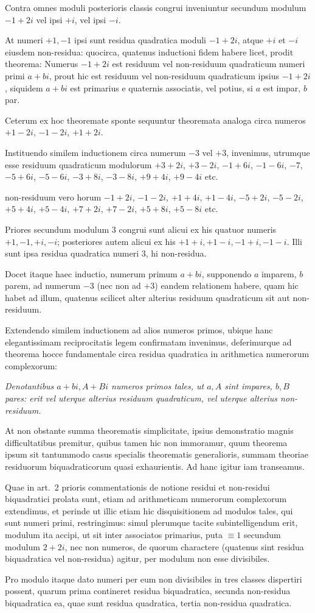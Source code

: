 Contra omnes moduli posterioris classis congrui inveniuntur secundum modulum $-1+2i$ vel ipsi $+i$, vel ipsi $-i$.

At numeri $+1,-1$ ipsi sunt residua quadratica moduli $-1+2i$, atque $+i$ et $-i$ eiusdem non-residua: quocirca, quatenus inductioni fidem habere licet, prodit theorema: Numerus $-1+2i$ est residuum vel non-residuum quadraticum numeri primi $a+bi$, prout hic est residuum vel non-residuum quadraticum ipsius $-1+2i$, siquidem $a+bi$ est primarius e quaternis associatis, vel potius, si $a$ est impar, $b$ par.

Ceterum ex hoc theoremate sponte sequuntur theoremata analoga circa numeros $+1-2i$, $-1-2i$, $+1+2i$.

Instituendo similem inductionem circa numerum $-3$ vel $+3$, invenimus, utrumque esse residuum quadraticum modulorum $+3+2i$, $+3-2i$,
%
$-1+6i$, $-1-6i$, $-7$, $-5+6i$, $-5-6i$, $-3+8i$, $-3-8i$, $+9+4i$, $+9-4i$ etc.

non-residuum vero horum $-1+2i$, $-1-2i$, $+1+4i$, $+1-4i$, $-5+2i$, $-5-2i$, $+5+4i$, $+5-4i$, $+7+2i$, $+7-2i$, $+5+8i$, $+5-8i$ etc.

Priores secundum modulum $3$ congrui sunt alicui ex his quatuor numeris $+1,-1,+i,-i$; posteriores autem alicui ex his $+1+i,+1-i,-1+i,-1-i$. Illi sunt ipsa residua quadratica numeri $3$, hi non-residua.

Docet itaque haec inductio, numerum primum $a+bi$, supponendo $a$ imparem, $b$ parem, ad numerum $-3$ (nec non ad $+3$) eandem relationem habere, quam hic habet ad illum, quatenus scilicet alter alterius residuum quadraticum sit aut non-residuum.

Extendendo similem inductionem ad alios numeros primos, ubique hanc elegantissimam reciprocitatis legem confirmatam invenimus, deferimurque ad theorema hocce fundamentale circa residua quadratica in arithmetica numerorum complexorum:

\emph{Denotantibus $a+bi,A+Bi$ numeros primos tales, ut $a,A$ sint impares, $b,B$ pares: erit vel uterque alterius residuum quadraticum, vel uterque alterius non-residuum.}

At non obstante summa theorematis simplicitate, ipsius demonstratio magnis difficultatibus premitur, quibus tamen hic non immoramur, quum theorema ipsum sit tantummodo casus specialis theorematis generalioris, summam theoriae residuorum biquadraticorum quasi exhaurientis. Ad hanc igitur iam transeamus.

Quae in art.~2 prioris commentationis de notione residui et non-residui biquadratici prolata sunt, etiam ad arithmeticam numerorum complexorum extendimus, et perinde ut illic etiam hic disquisitionem ad modulos tales, qui sunt numeri primi, restringimus: simul plerumque tacite subintelligendum erit, modulum ita accipi, ut sit inter associatos primarius, puta $\equiv1$ secundum modulum $2+2i$, nec non numeros, de quorum charactere (quatenus sint residua biquadratica vel non-residua) agitur, per modulum non esse divisibiles.

Pro modulo itaque dato numeri per eum non divisibiles in tres classes dispertiri possent, quarum prima contineret residua biquadratica, secunda non-residua biquadratica ea, quae sunt residua quadratica, tertia non-residua quadratica.

